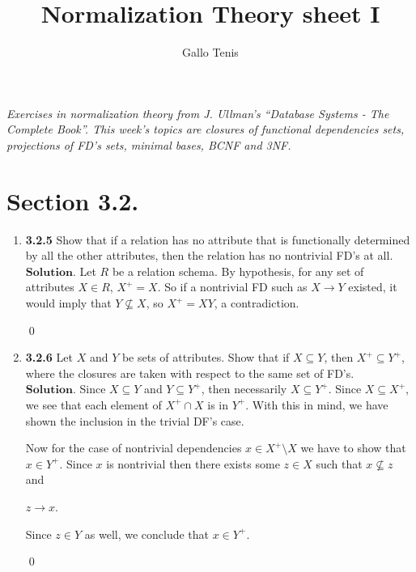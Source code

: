 \documentclass{article}
\title{Normalization Theory sheet I}
\author{Gallo Tenis}
\theoremstyle{remark}
\begin{document}
\maketitle

\begin{center}
    \textit{Exercises in normalization theory from J. Ullman's ``Database Systems - The Complete Book''.
    This week's topics are closures of functional dependencies sets, projections of FD's sets, minimal bases, BCNF and 3NF. 
    }
\end{center}
\section*{Section 3.2.}
\begin{enumerate}
    \item \textbf{3.2.5} Show that if a relation has no attribute that is functionally determined by all the other attributes, then the relation has no nontrivial FD's at all.\\
    $\textbf{Solution.}$ Let $R$ be a relation schema. By hypothesis, for any set of attributes $X \in R$, $X^+ = X$.
    So if a nontrivial FD such as $X \longrightarrow Y$ existed, it would imply that $Y \nsubseteq X$, so $X^+ = XY$, a contradiction.
    \begin{flushright}
        \qed
    \end{flushright}

    \item \textbf{3.2.6} Let \( X \) and \( Y \) be sets of attributes. Show that if \( X \subseteq Y \), then \( X^+ \subseteq Y^+ \), where the closures are taken with respect to the same set of FD's.\\
    $\textbf{Solution.}$ Since $X \subseteq Y$ and $Y \subseteq Y^+$, then necessarily $X \subseteq Y^+$. Since $X \subseteq X^+$, we see that each element of $X^+ \cap X$ is in $Y^+$.
    With this in mind, we have shown the inclusion in the trivial DF's case.

    Now for the case of nontrivial dependencies $x \in X^+ \setminus X$ we have to show that $x \in Y^+$.
    Since $x$ is nontrivial then there exists some $z \in X$ such that $x \nsubseteq z$ and
    \begin{center}
        $z \longrightarrow x$.
    \end{center}
    Since $z \in Y$ as well, we conclude that $x \in Y^+$.
    \begin{flushright}
        \qed
    \end{flushright}


\end{enumerate}
\end{document}
